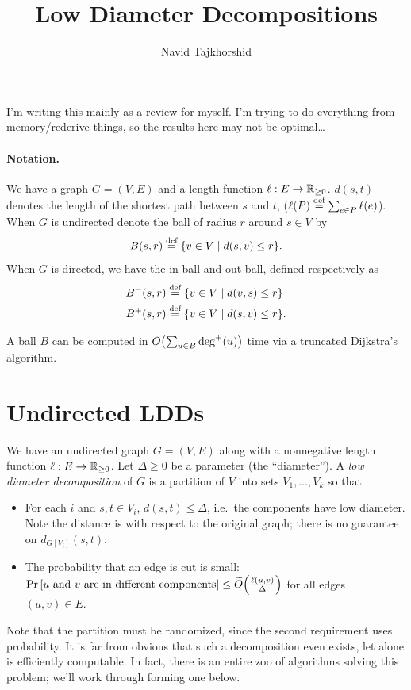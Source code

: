 \documentclass[12pt]{article}
\begin{document}
\title{Low Diameter Decompositions}
\author{Navid Tajkhorshid}

\maketitle

I'm writing this mainly as a review for myself. I'm trying to do everything from
memory/rederive things, so the results here may not be optimal\dots

\paragraph{Notation.}

We have a graph $G = (V, E)$ and a length function $\ell : E \to \mathbb{R}_{\geq 0}$.
$d(s, t)$ denotes the length of the shortest path between $s$ and $t$,
($\ell(P) \overset{\text{def}}{=} \sum_{e \in P}\ell(e)$). When $G$ is undirected denote the ball
of radius $r$ around $s \in V$ by
\[
  \ball{s, r} \defeq \Set{v \in V \mid d(s, v) \leq r}.
\]
When $G$ is directed, we have the in-ball and out-ball, defined respectively as
\begin{align*}
  \inball{s, r}  & \defeq \Set{v \in V \mid d(v, s) \leq r}  \\
  \outball{s, r} & \defeq \Set{v \in V \mid d(s, v) \leq r}.
\end{align*}

A ball $B$ can be computed in $\bigO{\sum_{u \in B}\outdeg{u}}$ time via a
truncated Dijkstra's algorithm.

\section{Undirected LDDs}

\begin{definition}
  We have an undirected graph $G = (V, E)$ along with a nonnegative length
  function $\ell : E \to \mathbb{R}_{\geq 0}$. Let $\Delta \geq 0$ be a parameter (the
  ``diameter''). A \emph{low diameter decomposition} of $G$ is a partition of
  $V$ into sets $V_1, \dots, V_k$ so that
  \begin{itemize}
    \item For each $i$ and $s, t \in V_i$, $d(s, t) \leq \Delta$, i.e.\ the
          components have low diameter. Note the distance is with respect to the
          original graph; there is no guarantee on $d_{G[V_i]}(s, t)$.

    \item The probability that an edge is cut is small: $\Pr{\text{$u$ and
              $v$ are in different components}} \leq \apxO{\frac{\ell(u,v)}{\Delta}}$ for all edges $(u, v) \in E$.
  \end{itemize}
\end{definition}
Note that the partition must be randomized, since the second requirement uses
probability. It is far from obvious that such a decomposition even exists, let
alone is efficiently computable. In fact, there is an entire zoo of algorithms
solving this problem; we'll work through forming one below.
\end{document}
